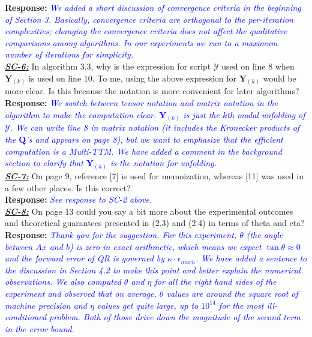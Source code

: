 \documentclass{article}
\newcommand{\mat}[1]{\mathbf{#1}}
\newcommand{\ten}[1]{\mathbf{\mathcal{#1}}}
\newcommand{\response}[1]{\textbf{Response:} \textcolor{blue}{\textit{#1}}\\}
\begin{document}
\response{We added a short discussion of convergence criteria in the beginning of Section 3. Basically, convergence criteria are orthogonal to the per-iteration complexities; changing the convergence criteria does not affect the qualitative comparisons among algorithms.  In our experiments we run to a maximum number of iterations for simplicity.}

\noindent \ul{\textit{\textbf{SC-6:}}} In algorithm 3.3, why is the expression for script $\ten{Y}$ used on line 8 when $\mat{Y}_{(k)}$ is used on line 10. To me, using the above expression for $\mat{Y}_{(k)}$ would be more clear. Is this because the notation is more convenient for later algorithms?\\

\response{We switch between tensor notation and matrix notation in the algorithm to make the computation clear.  $\mat{Y}_{(k)}$ is just the $k$th modal unfolding of $\ten{Y}$.  We can write line 8 in matrix notation (it includes the Kronecker products of the $\mat{Q}$'s and appears on page 8), but we want to emphasize that the efficient computation is a Multi-TTM.  We have added a comment in the background section to clarify that $\mat{Y}_{(k)}$ is the notation for unfolding.}

\noindent \ul{\textit{\textbf{SC-7:}}} On page 9, reference [7] is used for memoization, whereas [11] was used in a few other places. Is this correct?\\

\response{See response to SC-2 above.}


\noindent \ul{\textit{\textbf{SC-8:}}} On page 13 could you say a bit more about the experimental outcomes and theoretical guarantees presented in (2.3) and (2.4) in terms of theta and eta?\\

\response{Thank you for the suggestion.  For this experiment, $\theta$ (the angle between $Ax$ and $b$) is zero in exact arithmetic, which means we expect $\tan \theta \approx 0$ and the forward error of QR is governed by $\kappa \cdot \epsilon_{mach}$.  We have added a sentence to the discussion in Section 4.2 to make this point and better explain the numerical observations.  We also computed $\theta$ and $\eta$ for all the right hand sides of the experiment and observed that on average, $\theta$ values are around the square root of machine precision and $\eta$ values get quite large, up to $10^{14}$ for the most ill-conditioned problem.  Both of those drive down the magnitude of the second term in the error bound.}
\end{document}
